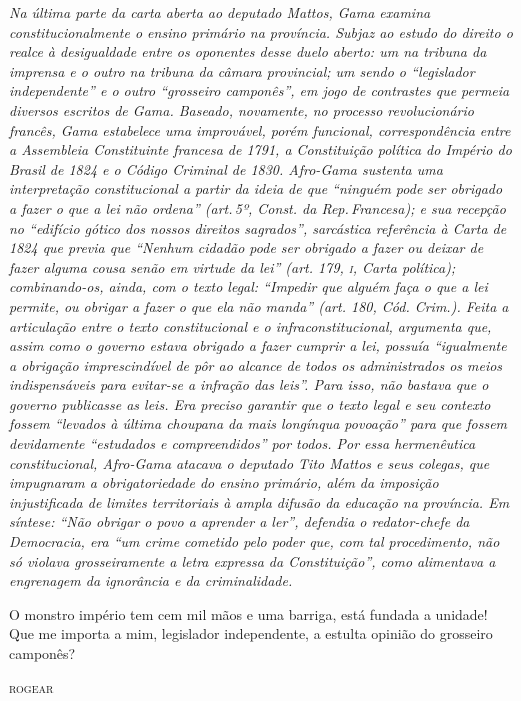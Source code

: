 \begin{didascalia}\itshape
Na última parte da carta aberta ao deputado
Mattos, Gama examina constitucionalmente o ensino
primário na província. Subjaz ao estudo do direito o realce
à desigualdade entre os oponentes
desse duelo aberto: um na tribuna da imprensa e o outro na tribuna da
câmara provincial; um sendo o ``legislador independente'' e o outro
``grosseiro camponês'', em jogo de contrastes que permeia diversos
escritos de Gama. 
Baseado, novamente, no processo
revolucionário francês, Gama estabelece uma improvável, porém funcional,
correspondência entre a Assembleia Constituinte francesa de 1791,
a Constituição política do Império do Brasil de 1824 e o
Código Criminal de 1830. 
Afro-Gama sustenta uma
interpretação constitucional a partir da ideia de que ``ninguém pode ser
obrigado a fazer o que a lei não ordena'' (art.\,5º, Const. da
Rep.\,Francesa); e sua recepção no ``edifício gótico dos nossos
direitos sagrados'', sarcástica referência à Carta de 1824 que previa que
``Nenhum cidadão pode ser obrigado a fazer ou deixar
de fazer alguma cousa senão em virtude da lei'' (art. 179, \textsc{i}, Carta
política); combinando-os, ainda, com o texto legal: ``Impedir que
alguém faça o que a lei permite, ou obrigar a fazer o que ela não manda''
(art. 180, Cód. Crim.). Feita a articulação entre o texto
constitucional e o infraconstitucional, argumenta que,
assim como o governo estava obrigado a fazer cumprir a lei,
possuía ``igualmente a obrigação imprescindível de pôr ao alcance de
todos os administrados os meios indispensáveis para evitar-se a infração
das leis''. Para isso, não bastava que o governo publicasse as leis.
Era preciso garantir que o texto legal e seu contexto fossem
``levados à última choupana da mais longínqua povoação'' para que
fossem devidamente ``estudados e compreendidos'' por todos. Por essa hermenêutica
constitucional, Afro-Gama atacava o deputado Tito Mattos e seus
colegas, que impugnaram a obrigatoriedade do ensino
primário, além da imposição injustificada de limites 
territoriais à ampla difusão da educação na província.
Em síntese: ``Não obrigar o povo a aprender a ler'', defendia o redator-chefe da \textnormal{Democracia}, era ``um crime cometido pelo poder
que, com tal procedimento, não só violava grosseiramente a letra
expressa da Constituição'', como alimentava a engrenagem da ignorância e
da criminalidade.
\end{didascalia}



\epigraph{O monstro império tem cem mil mãos e uma barriga, está fundada a
unidade! Que me importa a mim, legislador independente, a
estulta\footnotemark{} opinião do grosseiro camponês?}{\textsc{rogear}\footnotemark}

